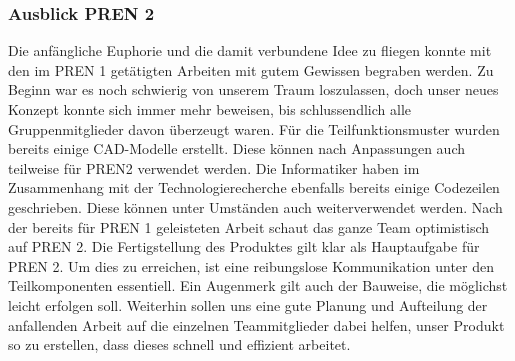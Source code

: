 \subsubsection{Ausblick PREN 2}
Die anfängliche Euphorie und die damit verbundene Idee zu fliegen konnte mit den im PREN 1 getätigten Arbeiten mit gutem Gewissen begraben werden. Zu Beginn war es noch schwierig von unserem Traum loszulassen, doch unser neues Konzept konnte sich immer mehr beweisen, bis schlussendlich alle Gruppenmitglieder davon überzeugt waren.
Für die Teilfunktionsmuster wurden bereits einige CAD-Modelle erstellt. Diese können nach Anpassungen auch teilweise für PREN2 verwendet werden. Die Informatiker haben im Zusammenhang mit der Technologierecherche ebenfalls bereits einige Codezeilen geschrieben. Diese können unter Umständen auch weiterverwendet werden.
Nach der bereits für PREN 1 geleisteten Arbeit schaut das ganze Team optimistisch auf PREN 2. Die Fertigstellung des Produktes gilt klar als Hauptaufgabe für PREN 2. Um dies zu erreichen, ist eine reibungslose Kommunikation unter den Teilkomponenten essentiell. Ein Augenmerk gilt auch der Bauweise, die möglichst leicht erfolgen soll. Weiterhin sollen uns eine gute Planung und Aufteilung der anfallenden Arbeit auf die einzelnen Teammitglieder dabei helfen, unser Produkt so zu erstellen, dass dieses schnell und effizient arbeitet.
